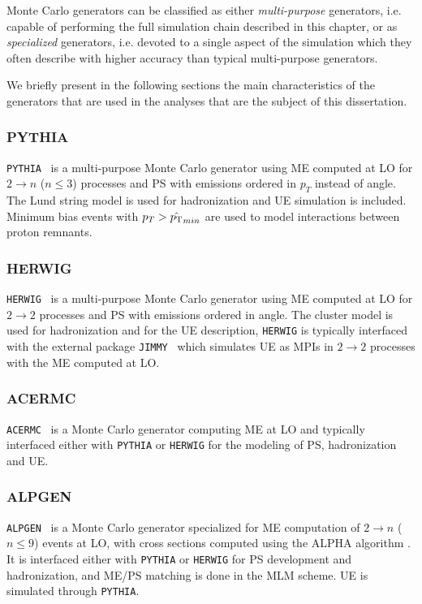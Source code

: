 Monte Carlo generators can be classified as either {\it multi-purpose} generators,
i.e. capable of performing the full simulation chain described in this chapter,
or as {\it specialized} generators, i.e. devoted to a single aspect of the
simulation which they often describe with higher accuracy than
typical multi-purpose generators. 

We briefly present in the following sections the main characteristics of the generators
that are used in the analyses that are the subject of this dissertation.

\subsubsection*{PYTHIA}

\texttt{PYTHIA}~\cite{PYTHIA,Sjostrand:2007gs} is a multi-purpose Monte Carlo generator
using ME computed at LO for $2 \to n$ ($n\leq 3$) processes and PS with emissions
ordered in $p_T$ instead of angle. The Lund string model is used for hadronization
and UE simulation is included.
Minimum bias events with $p_T>\hat{p_{\mathrm{T}}}_{min}$ are used to model interactions
between proton remnants.


\subsubsection*{HERWIG}

\texttt{HERWIG}~\cite{HERWIG} is a multi-purpose Monte Carlo generator
using ME computed at LO for $2 \to 2$ processes and PS with emissions ordered in angle. 
The cluster model is used for hadronization and for the UE description, \texttt{HERWIG}
is typically interfaced with the external package \texttt{JIMMY}~\cite{jimmy} which
simulates UE as MPIs in  $2 \to 2$ processes with the ME computed at LO.


\subsubsection*{ACERMC}

\texttt{ACERMC}~\cite{acermc} is a Monte Carlo generator computing
ME at LO and typically interfaced either with \texttt{PYTHIA} or 
\texttt{HERWIG} for the modeling of PS, hadronization and UE.


\subsubsection*{ALPGEN}

\texttt{ALPGEN}~\cite{ALPGEN} is a Monte Carlo generator specialized for
ME computation of $2 \to n$ ($n\leq 9$) events at LO, with cross sections 
computed using the ALPHA algorithm \cite{ALPGEN_0}. It is interfaced either
with \texttt{PYTHIA} or \texttt{HERWIG} for PS development 
and hadronization, and ME/PS matching
is done in the MLM scheme.
UE is simulated through \texttt{PYTHIA}. 

